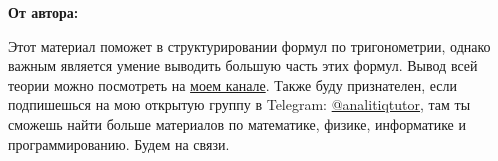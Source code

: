 \documentclass{article}
\begin{document}
\begin{multicols*}{2}
\textbf{От автора:}

Этот материал поможет в структурировании формул по тригонометрии, однако важным является умение выводить большую часть этих формул. Вывод всей теории можно посмотреть на \href{https://www.youtube.com/watch?v=Jmlm2BkNUCI&t=1477s}{моем канале}. Также буду признателен, если подпишешься на мою открытую группу в Telegram: \href{https://t.me/analitiqtutor}{@analitiqtutor}, там ты сможешь найти больше материалов по математике, физике, информатике и программированию. Будем на связи.


\end{multicols*}
\end{document}

